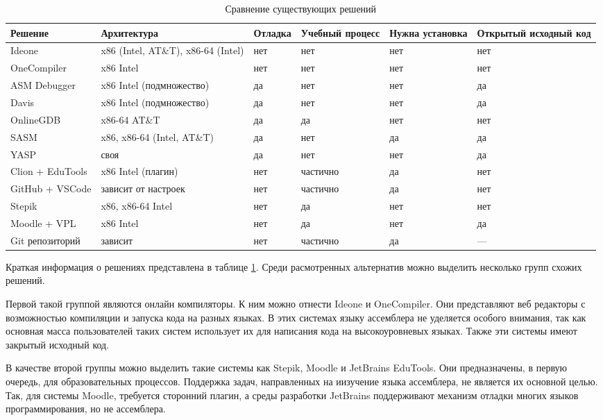 \documentclass[a4paper,article,14pt]{extarticle}
\begin{document}
\begin{table}[ht]
\small
    \begin{tabular}{|p{3.1cm}|p{2.4cm}|p{2cm}|p{2cm}|p{2cm}|p{2cm}|}
    \hline
    \textbf{Решение} & \textbf{Архитектура} & \textbf{Отладка} & \textbf{Учебный процесс} & \textbf{Нужна установка} & \textbf{Открытый исходный код} \\
    \hline
    Ideone & x86 (Intel, AT\&T), x86-64 (Intel) & нет & нет & нет & нет \\ \hline
    OneCompiler & x86 Intel & нет & нет & нет & нет \\ \hline
    ASM Debugger & x86 Intel (подмножество) & да & нет & нет & да \\ \hline
    Davis & x86 Intel (подмножество) & да & нет & нет & да \\ \hline
    OnlineGDB & x86-64 AT\&T & да & да & нет & нет \\ \hline
    SASM & x86, x86-64 (Intel, AT\&T) & да & нет & да & да \\ \hline
    YASP & своя & да & нет & нет & да \\ \hline
    Clion + EduTools & x86 Intel (плагин) & нет & частично & да & нет \\ \hline
    GitHub + VSCode & зависит от настроек & нет & частично & да & нет \\ \hline
    Stepik & x86, x86-64 Intel & нет & да & нет & нет \\ \hline
    Moodle + VPL & x86 Intel & нет & да & нет & да \\ \hline
    Git репозиторий & зависит & нет & частично & да & --- \\ \hline
    \end{tabular}
\caption{\label{table:alternatives}Сравнение существующих решений}
\normalsize
\end{table}

Краткая информация о решениях представлена в таблице \ref{table:alternatives}. Среди расмотренных альтернатив можно выделить несколько групп схожих решений.

Первой такой группой являются онлайн компиляторы. К ним можно отнести Ideone и OneCompiler. Они представляют веб редакторы с возможностью компиляции и запуска кода на разных языках. В этих системах языку ассемблера не уделяется особого внимания, так как основная масса пользователей таких систем использует их для написания кода на высокоуровневых языках. Также эти системы имеют закрытый исходный код.

В качестве второй группы можно выделить такие системы как Stepik, Moodle и JetBrains EduTools. Они предназначены, в первую очередь, для образовательных процессов. Поддержка задач, направленных на иизучение языка ассемблера, не является их основной целью. Так, для системы Moodle, требуется сторонний плагин, а среды разработки JetBrains поддерживают механизм отладки многих языков программирования, но не ассемблера.
\end{document}
